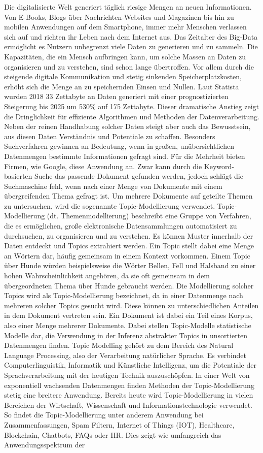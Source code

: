 \documentclass[german,version-2020-11]{uzl-thesis}
\begin{document}
Die digitalisierte Welt generiert täglich riesige Mengen an neuen Informationen. Von E-Books, Blogs über Nachrichten-Websites und Magazinen bis hin zu mobilen Anwendungen auf dem Smartphone, immer mehr Menschen verlassen sich auf und richten ihr Leben nach dem Internet aus. Das Zeitalter des Big-Data ermöglicht es Nutzern unbegrenzt viele Daten zu generieren und zu sammeln. Die Kapazitäten, die ein Mensch aufbringen kann, um solche Massen an Daten zu organisieren und zu verstehen, sind schon lange übertroffen. Vor allem durch die steigende digitale Kommunikation und stetig sinkenden Speicherplatzkosten, erhöht sich die Menge an zu speichernden Einsen und Nullen. Laut Statista \cite{statista}  wurden 2018 33 Zettabyte an Daten generiert mit einer prognostizierten Steigerung bis 2025 um 530\% auf 175 Zettabyte. Dieser dramatische Anstieg zeigt die Dringlichkeit für effiziente Algorithmen und Methoden der Datenverarbeitung. Neben der reinen Handhabung solcher Daten steigt aber auch das Bewusstsein, aus diesen Daten Verständnis und Potentiale zu schaffen. Besonders Suchverfahren gewinnen an Bedeutung, wenn in großen, unübersichtlichen Datenmengen bestimmte Informationen gefragt sind. Für die Mehrheit bieten Firmen, wie Google, diese Anwendung an. Zwar kann durch die Keyword-basierten Suche das passende Dokument gefunden werden, jedoch schlägt die Suchmaschine fehl, wenn nach einer Menge von Dokumente mit einem übergreifenden Thema gefragt ist. Um mehrere Dokumente auf geteilte Themen zu untersuchen, wird die sogenannte Topic-Modellierung verwendet. Topic-Modellierung (dt. Themenmodellierung) beschreibt eine Gruppe von Verfahren, die es ermöglichen, große elektronische Datensammlungen automatisiert zu durchsuchen, zu organisieren und zu verstehen. Es können Muster innerhalb der Daten entdeckt und Topics extrahiert werden. Ein Topic stellt dabei eine Menge an Wörtern dar, häufig gemeinsam in einem Kontext vorkommen. Einem Topic über Hunde würden beispielsweise die Wörter Bellen, Fell und Halsband zu einer hohen Wahrscheinlichkeit angehören, da sie oft gemeinsam in dem übergeordneten Thema über Hunde gebraucht werden. Die Modellierung solcher Topics wird als Topic-Modellierung bezeichnet, da in einer Datenmenge nach mehreren solcher Topics gesucht wird. Diese können zu unterschiedlichen Anteilen in dem Dokument vertreten sein. Ein Dokument ist dabei ein Teil eines Korpus, also einer Menge mehrerer Dokumente. Dabei stellen Topic-Modelle statistische Modelle dar, die Verwendung in der Inferenz abstrakter Topics in unsortierten Datenmengen finden. Topic Modelling gehört zu dem Bereich des Natural Language Processing, also der Verarbeitung natürlicher Sprache. Es verbindet Computerlinguistik, Informatik und Künstliche Intelligenz, um die Potentiale der Sprachverarbeitung mit der heutigen Technik auszuschöpfen. In einer Welt von exponentiell wachsenden Datenmengen finden Methoden der Topic-Modellierung stetig eine breitere Anwendung. Bereits heute wird Topic-Modellierung in vielen Bereichen der Wirtschaft, Wissenschaft und Informationstechnologie verwendet. So findet die Topic-Modellierung unter anderem Anwendung bei Zusammenfassungen, Spam Filtern, Internet of Things (IOT), Healthcare, Blockchain, Chatbots, FAQs oder HR. Dies zeigt wie umfangreich das Anwendungsspektrum der 
\end{document}
